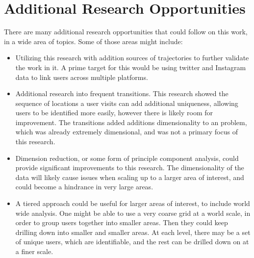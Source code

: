 
\chapter[Additional Research Opportunities]{Additional Research Opportunities}
\label{sec:additional}

There are many additional research opportunities that could follow on this work, in a wide area of topics. Some of those areas might include:

\begin{itemize}
  \item Utilizing this research with addition sources of trajectories to further validate the work in it. A prime target for this would be using twitter and Instagram data to link users across multiple platforms.
  \item Additional research into frequent transitions. This research showed the sequence of locations a user visits can add additional uniqueness, allowing users to be identified more easily, however there is likely room for improvement. The transitions added additions dimensionality to an problem, which was already extremely dimensional, and was not a primary focus of this research.
  \item Dimension reduction, or some form of principle component analysis, could provide significant improvements to this research. The dimensionality of the data will likely cause issues when scaling up to a larger area of interest, and could become a hindrance in very large areas.
  \item A tiered approach could be useful for larger areas of interest, to include world wide analysis. One might be able to use a very coarse grid at a world scale, in order to group users together into smaller areas. Then they could keep drilling down into smaller and smaller areas. At each level, there may be a set of unique users, which are identifiable, and the rest can be drilled down on at a finer scale.
\end{itemize}
